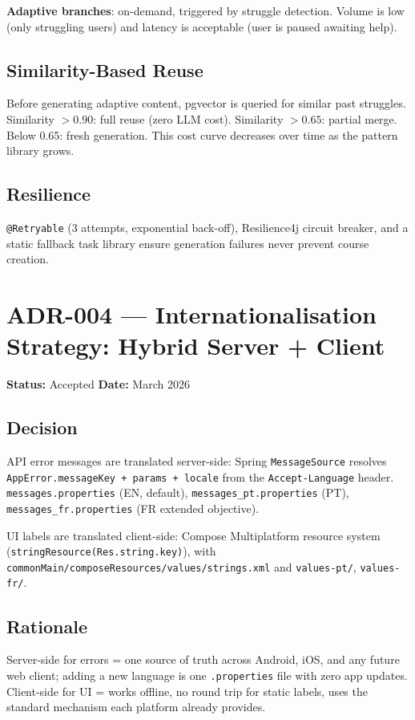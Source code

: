 \textbf{Adaptive branches}: on-demand, triggered by struggle detection. Volume is low (only struggling users) and latency is acceptable (user is paused awaiting help).

\subsection*{Similarity-Based Reuse}
Before generating adaptive content, pgvector is queried for similar past struggles. Similarity $>0.90$: full reuse (zero LLM cost). Similarity $>0.65$: partial merge. Below 0.65: fresh generation. This cost curve decreases over time as the pattern library grows.

\subsection*{Resilience}
\texttt{@Retryable} (3 attempts, exponential back-off), Resilience4j circuit breaker, and a static fallback task library ensure generation failures never prevent course creation.

\section{ADR-004 — Internationalisation Strategy: Hybrid Server + Client}
\label{adr:004}
\textbf{Status:} Accepted \quad \textbf{Date:} March 2026

\subsection*{Decision}
API error messages are translated server-side: Spring \texttt{MessageSource} resolves \texttt{AppError.messageKey + params + locale} from the \texttt{Accept-Language} header. \texttt{messages.properties} (EN, default), \texttt{messages\_pt.properties} (PT), \texttt{messages\_fr.properties} (FR extended objective).

UI labels are translated client-side: Compose Multiplatform resource system (\texttt{stringResource(Res.string.key)}), with \texttt{commonMain/composeResources/values/strings.xml} and \texttt{values-pt/}, \texttt{values-fr/}.

\subsection*{Rationale}
Server-side for errors = one source of truth across Android, iOS, and any future web client; adding a new language is one \texttt{.properties} file with zero app updates. Client-side for UI = works offline, no round trip for static labels, uses the standard mechanism each platform already provides.

